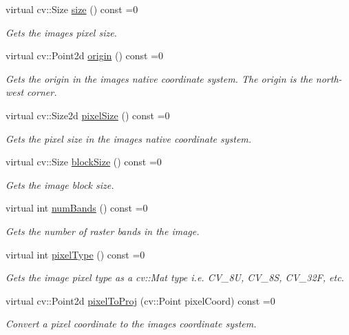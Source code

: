 \begin{DoxyCompactItemize}
virtual cv\+::\+Size \hyperlink{group___imagery_module_gaac80b110347bd25c8fbdefef229d89c6}{size} () const =0
\begin{DoxyCompactList}\small\item\em Gets the image\textquotesingle{}s pixel size. \end{DoxyCompactList}\item 
virtual cv\+::\+Point2d \hyperlink{group___imagery_module_ga6dff2792da9db73d8d80e5841edce606}{origin} () const =0
\begin{DoxyCompactList}\small\item\em Gets the origin in the image\textquotesingle{}s native coordinate system. The origin is the north-\/west corner. \end{DoxyCompactList}\item 
virtual cv\+::\+Size2d \hyperlink{group___imagery_module_ga11359d5f53eff7d8ac2e661f31eb4f1a}{pixel\+Size} () const =0
\begin{DoxyCompactList}\small\item\em Gets the pixel size in the image\textquotesingle{}s native coordinate system. \end{DoxyCompactList}\item 
virtual cv\+::\+Size \hyperlink{group___imagery_module_ga02738a1beaa1dd55f6d06593fe9a4c6f}{block\+Size} () const =0
\begin{DoxyCompactList}\small\item\em Gets the image block size. \end{DoxyCompactList}\item 
virtual int \hyperlink{group___imagery_module_ga27b0bde15551e580dc658947d7d29f61}{num\+Bands} () const =0
\begin{DoxyCompactList}\small\item\em Gets the number of raster bands in the image. \end{DoxyCompactList}\item 
virtual int \hyperlink{group___imagery_module_ga3cb616a1de3ee19bebfdf14957d90d7c}{pixel\+Type} () const =0
\begin{DoxyCompactList}\small\item\em Gets the image pixel type as a cv\+::\+Mat type i.\+e. C\+V\+\_\+8U, C\+V\+\_\+8S, C\+V\+\_\+32F, etc. \end{DoxyCompactList}\item 
virtual cv\+::\+Point2d \hyperlink{group___imagery_module_ga6ef753bbb1d8a5dfa56a72de21af4f08}{pixel\+To\+Proj} (cv\+::\+Point pixel\+Coord) const =0
\begin{DoxyCompactList}\small\item\em Convert a pixel coordinate to the image\textquotesingle{}s coordinate system. \end{DoxyCompactList}\item 

\end{DoxyCompactItemize}
